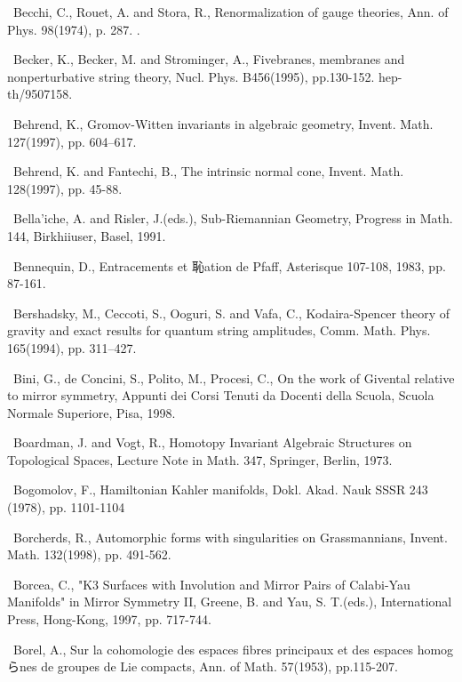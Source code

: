 {\noindent [37]\ Becchi, C., Rouet, A. and Stora, R., Renormalization of gauge theories, Ann. of Phys. 98(1974), p. 287. .\par\smallskip
\noindent [38]\ Becker, K., Becker, M. and Strominger, A., Fivebranes, membranes and nonperturbative string theory, Nucl. Phys. B456(1995), pp.130-152. hep-th/9507158.\par\smallskip
\noindent [39]\ Behrend, K., Gromov-Witten invariants in algebraic geometry, Invent. Math. 127(1997), pp. 604--617.\par\smallskip
\noindent [40]\ Behrend, K. and Fantechi, B., The intrinsic normal cone, Invent. Math. 128(1997), pp. 45-88.\par\smallskip
\noindent [41]\ Bella'iche, A. and Risler, J.(eds.), Sub-Riemannian Geometry, Progress in Math. 144, Birkhiiuser, Basel, 1991.\par\smallskip
\noindent [42]\ Bennequin, D., Entracements et 恥ation de Pfaff, Asterisque 107-108, 1983, pp. 87-161.\par\smallskip
\noindent [43]\ Bershadsky, M., Ceccoti, S., Ooguri, S. and Vafa, C., Kodaira-Spencer theory of gravity and exact results for quantum string amplitudes, Comm. Math. Phys. 165(1994), pp. 311--427.\par\smallskip
\noindent [44]\ Bini, G., de Concini, S., Polito, M., Procesi, C., On the work of Givental relative to mirror symmetry, Appunti dei Corsi Tenuti da Docenti della Scuola, Scuola Normale Superiore, Pisa, 1998.\par\smallskip
\noindent [45]\ Boardman, J. and Vogt, R., Homotopy Invariant Algebraic Structures on Topological Spaces, Lecture Note in Math. 347, Springer, Berlin, 1973.\par\smallskip
\noindent [46]\ Bogomolov, F., Hamiltonian Kahler manifolds, Dokl. Akad. Nauk SSSR 243 (1978), pp. 1101-1104\par\smallskip
\noindent [47]\ Borcherds, R., Automorphic forms with singularities on Grassmannians, Invent. Math. 132(1998), pp. 491-562.\par\smallskip
\noindent [48]\ Borcea, C., "K3 Surfaces with Involution and Mirror Pairs of Calabi-Yau Manifolds" in Mirror Symmetry II, Greene, B. and Yau, S. T.(eds.), International Press, Hong-Kong, 1997, pp. 717-744.\par\smallskip
\noindent [49]\ Borel, A., Sur la cohomologie des espaces fibres principaux et des espaces homogらnes de groupes de Lie compacts, Ann. of Math. 57(1953), pp.115-207.\par\smallskip
}
